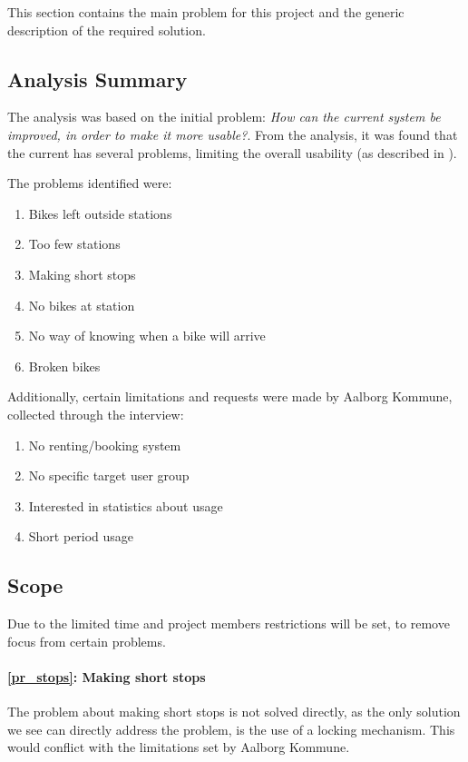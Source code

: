 This section contains the main problem for this project and the generic description of the required solution.

\subsection{Analysis Summary}
The analysis was based on the initial problem: \textit{How can the current \citybike system be improved, in order to make it more usable?}.
From the analysis, it was found that the current \citybike has several problems, limiting the overall usability (as described in ).

The problems identified were:
\begin{enumerate}
\item Bikes left outside stations \label{pr_stations}
\item Too few stations \label{pr_few}
\item Making short stops \label{pr_stops}
\item No bikes at station \label{pr_nobikes}
\item No way of knowing when a bike will arrive \label{pr_arrive}
\item Broken bikes \label{pr_broken}
\end{enumerate}

Additionally, certain limitations and requests were made by Aalborg Kommune, collected through the interview:

\begin{enumerate}
\item No renting/booking system
\item No specific target user group
\item Interested in statistics about usage \label{pr_stats}
\item Short period usage
\end{enumerate}

\subsection{Scope}
Due to the limited time and project members restrictions will be set, to remove focus from certain problems.

\paragraph{\ref{pr_stops}: Making short stops} The problem about making short stops is not solved directly, as the only solution we see can directly address the problem, is the use of a locking mechanism.
This would conflict with the limitations set by Aalborg Kommune.

